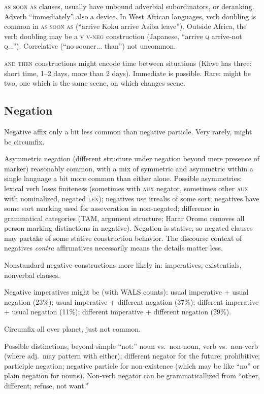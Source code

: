 \documentclass[11pt]{article}
\newcommand{\E}[1]{\textit{#1}}   %
\newcommand{\I}[1]{\textsc{#1}}   %
\begin{document}
\I{as soon as} clauses, usually have unbound adverbial subordinators,
or deranking.  Adverb ``immediately'' also a device.  In West African
languages, verb doubling is common in \I{as soon as} (``arrive Koku
arrive Asiba leave'').  Outside Africa, the verb doubling may be a
\I{v v-neg} construction (Japanese, ``arrive \I{q} arrive-not
\I{q}...'').  Correlative (``no sooner... than'') not uncommon.

\I{and then} constructions might encode time between situations (Khwe
has three: short time, 1--2 days, more than 2 days). Immediate is
possible.  Rare: might be two, one which is the same scene, on which
changes scene.


\subsection{Negation}
Negative affix only a bit less common than negative particle.  Very
rarely, might be circumfix.

Asymmetric negation (different structure under negation beyond mere
presence of marker) reasonably common, with a mix of symmetric and
asymmetric within a single language a bit more common than either
alone.  Possible asymmetries: lexical verb loses finiteness (sometimes
with \I{aux} negator, sometimes other \I{aux} with nominalized,
negated \I{lex}); negatives use irrealis of some sort; negatives have
some sort marking used for asseveration in non-negated; difference in
grammatical categories (TAM, argument structure; Harar Oromo removes
all person marking distinctions in negative).  Negation is stative, so
negated clauses may partake of some stative construction behavior.
The discourse context of negatives \E{contra} affirmatives necessarily
means the details matter less.

Nonstandard negative constructions more likely in: imperatives,
existentials, nonverbal clauses.

Negative imperatives might be (with WALS counts): usual imperative +
usual negation (23\%); usual imperative + different negation (37\%);
different imperative + usual negation (11\%); different imperative +
different negation (29\%).

Circumfix all over planet, just not common.

Possible distinctions, beyond simple ``not:'' noun vs.\ non-noun, verb
vs.\ non-verb (where adj.\ may pattern with either); different negator
for the future; prohibitive; participle negation; negative particle
for non-existence (which may be like ``no'' or plain negation for
nouns).  Non-verb negator can be grammaticallized from ``other,
different; refuse, not want.''
\end{document}
